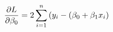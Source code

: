 \documentclass[preview]{standalone}
\begin{document}
\begin{align*}
\special{dvisvgm:raw <g id='unique000'>}\frac{\partial L}{\partial \beta_0} =  \special{dvisvgm:raw </g>}\special{dvisvgm:raw <g id='unique001'>}2\sum_{i=1}^n{(y_i-(\beta_0+\beta_1 x_i)}\special{dvisvgm:raw </g>}
\end{align*}
\end{document}
